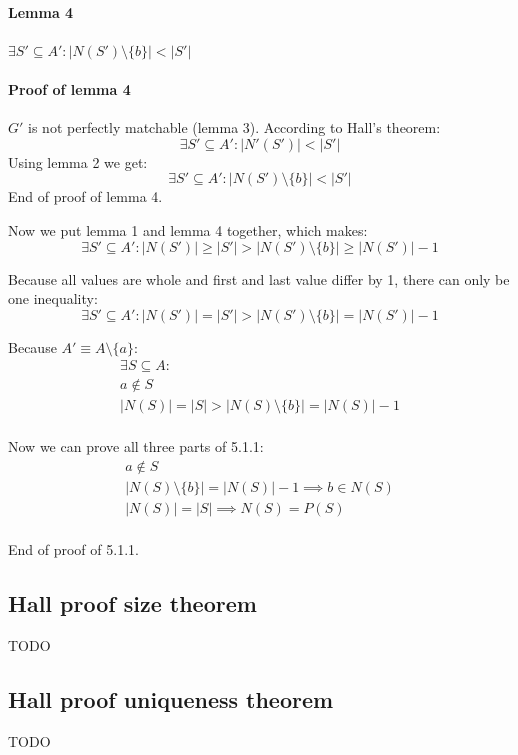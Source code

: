 \paragraph{Lemma 4} $\exists S' \subseteq A': \left|N(S') \setminus \{b\}\right| < \left|S'\right|$

\paragraph{Proof of lemma 4}
$G'$ is not perfectly matchable (lemma 3).
According to Hall's theorem:
\[
    \exists S' \subseteq A': \left|N'(S')\right| < \left|S'\right|
\]
Using lemma 2 we get:
\[
    \exists S' \subseteq A': \left|N(S') \setminus \{b\}\right| < \left|S'\right|
\]
End of proof of lemma 4.

\bigskip

Now we put lemma 1 and lemma 4 together, which makes:
\[
    \exists S' \subseteq A': \left|N(S')\right| \geq \left|S'\right| > \left|N(S') \setminus \{b\} \right| \geq \left|N(S')\right| - 1
\]

Because all values are whole and first and last value differ by 1, there can only be one inequality:
\[
    \exists S' \subseteq A': \left|N(S')\right| = \left|S'\right| > \left|N(S') \setminus \{b\} \right| = \left|N(S')\right| - 1
\]

Because $A' \equiv A \setminus \{a\}$:
\begin{gather*}
    \exists S \subseteq A: \\
    a \notin S \\
    \left|N(S)\right| = \left|S\right| > \left|N(S) \setminus \{b\} \right| = \left|N(S)\right| - 1 \\
\end{gather*}

Now we can prove all three parts of 5.1.1:
\begin{gather*}
    a \notin S \\
    \left|N(S) \setminus \{b\} \right| = \left|N(S)\right| - 1 \implies b \in N(S) \\
    \left|N(S)\right| = \left|S\right| \implies N(S) = P(S) \\
\end{gather*}

End of proof of 5.1.1.

\subsection{Hall proof size theorem}
TODO

\subsection{Hall proof uniqueness theorem}
TODO
